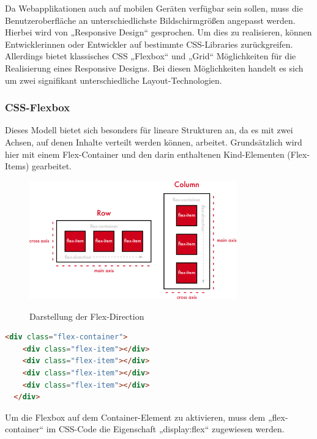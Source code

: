 Da Webapplikationen auch auf mobilen Geräten verfügbar sein sollen, muss die Benutzeroberfläche an unterschiedlichste Bildschirmgrößen angepasst werden. Hierbei wird von „Responsive Design“ gesprochen. Um dies zu realisieren, können Entwicklerinnen oder Entwickler auf bestimmte CSS-Libraries zurückgreifen. Allerdings bietet klassisches CSS „Flexbox“ und „Grid“ Möglichkeiten für die Realisierung eines Responsive Designs. Bei diesen Möglichkeiten handelt es sich um zwei signifikant unterschiedliche Layout-Technologien.

\subsubsection{CSS-Flexbox}

Dieses Modell bietet sich besonders für lineare Strukturen an, da es mit zwei Achsen, auf denen Inhalte verteilt werden können, arbeitet. Grundsätzlich wird hier mit einem Flex-Container und den darin enthaltenen Kind-Elementen (Flex-Items) gearbeitet. 
\cite{flexbox}

\begin{figure}[H]
  \centering
  \includegraphics[width=0.8\textwidth]{pics/flexDirection.png}
  \caption{Darstellung der Flex-Direction}
  \cite{flexbox2}
\end{figure}


\begin{lstlisting}[language=HTML, caption=HTML-Code vom Aufbau einer Flexbox , label=lst:impl:flexHTML]
  <div class="flex-container">
    <div class="flex-item"></div>
    <div class="flex-item"></div>
    <div class="flex-item"></div>
    <div class="flex-item"></div>
  </div>
\end{lstlisting} \cite{flexbox}

Um die Flexbox auf dem Container-Element zu aktivieren, muss dem „flex-container“ im CSS-Code die Eigenschaft „display:flex“ zugewiesen werden. 
\cite{flexbox}

